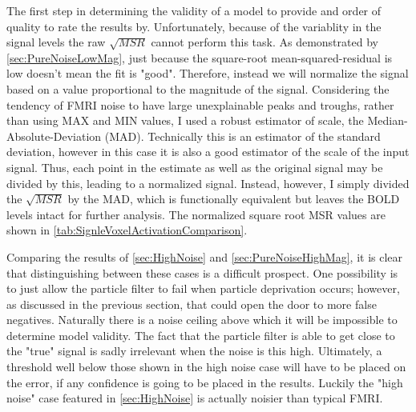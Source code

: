 The first step in determining the validity of a model to provide and order of quality
to rate the results by. Unfortunately, because of the variablity in the signal levels the
raw $\sqrt{MSR}$ cannot perform this task. As demonstrated by \autoref{sec:PureNoiseLowMag},
just because the square-root mean-squared-residual is low doesn't mean the fit is
"good". Therefore, instead we will normalize the signal based on a value proportional to
the magnitude of the signal. Considering the tendency of FMRI noise to have large unexplainable
peaks and troughs, rather than using MAX and MIN values, I used a robust estimator of 
scale, the Median-Absolute-Deviation (MAD). Technically this is an estimator of the standard
deviation, however in this case it is also a good estimator of the scale of the input
signal. Thus, each point in the estimate as well as the original signal may be divided by
this, leading to a normalized signal. Instead, however, I simply divided the 
$\sqrt{MSR}$ by the MAD, which is functionally equivalent but leaves the  BOLD
levels intact for further analysis. The normalized square root MSR values are 
shown in \autoref{tab:SignleVoxelActivationComparison}. 

Comparing the results of \autoref{sec:HighNoise} and \autoref{sec:PureNoiseHighMag}, it is
clear that distinguishing between these cases is a difficult prospect. One possibility
is to just allow the particle filter to fail when particle deprivation occurs; however,
as discussed in the previous section, that could open the door to more false negatives.
Naturally there is a noise ceiling above which it will be impossible to determine model 
validity. The fact
that the particle filter is able to get close to the "true" signal is sadly irrelevant
when the noise is this high.
Ultimately, a threshold well below those shown in the high noise case 
will have to be placed on the error, if any confidence is going to be placed in
the results. Luckily the "high noise" case featured in \autoref{sec:HighNoise}
is actually noisier than typical FMRI.

